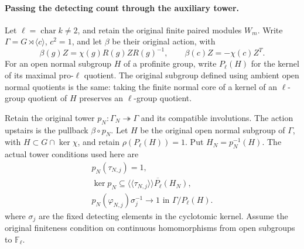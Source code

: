 \paragraph{Passing the detecting count through the auxiliary tower.}
Let $\ell=\operatorname{char}k\ne2$, and retain the original finite
paired modules $W_m$. Write $\Gamma=G\rtimes\langle c\rangle$,
$c^2=1$, and let $\beta$ be their original action, with
\[
 \beta(g)Z=\chi(g)R(g)ZR(g)^{-1},\qquad
 \beta(c)Z=-\chi(c)Z^T.
\]
For an open normal subgroup $H$ of a profinite group, write
$P_\ell(H)$ for the kernel of its maximal pro-$\ell$ quotient.
The original subgroup defined using ambient open normal quotients is
the same: taking the finite normal core of a kernel of an
$\ell$-group quotient of $H$ preserves an $\ell$-group quotient.

Retain the original tower $p_N:\Gamma_N\twoheadrightarrow\Gamma$
and its compatible involutions. The action upstairs is the pullback
$\beta\circ p_N$. Let $H$ be the original open normal subgroup of
$\Gamma$, with $H\subset G\cap\ker\chi$, and retain
$\rho(P_\ell(H))=1$. Put $H_N=p_N^{-1}(H)$.
The actual tower conditions used here are
\[
 \begin{gathered}
 p_N(\tau_{N,j})=1,\\
 \ker p_N\subseteq
 \overline{\langle\!\langle\tau_{N,j}\rangle\!\rangle P_\ell(H_N)},\\
 p_N(\varphi_{N,j})\sigma_j^{-1}\longrightarrow1
                  \text{ in }\Gamma/P_\ell(H).
 \end{gathered}
\]
where $\sigma_j$ are the fixed detecting elements in the cyclotomic
kernel. Assume the original finiteness condition on continuous
homomorphisms from open subgroups to $\mathbb F_\ell$.

